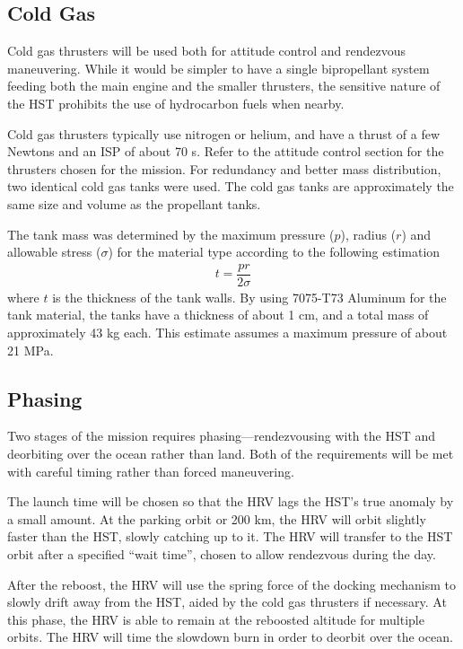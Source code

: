 \documentclass[paper=letter, fontsize=11pt]{scrartcl} %
\numberwithin{equation}{section} %
\numberwithin{figure}{section} %
\numberwithin{table}{section} %
\begin{document}
\subsection{Cold Gas}

Cold gas thrusters will be used both for attitude control and rendezvous maneuvering. While it would be simpler to have a single bipropellant system feeding both the main engine and the smaller thrusters, the sensitive nature of the HST prohibits the use of hydrocarbon fuels when nearby.

Cold gas thrusters typically use nitrogen or helium, and have a thrust of a few Newtons and an ISP of about 70 s. Refer to the attitude control section for the thrusters chosen for the mission. For redundancy and better mass distribution, two identical cold gas tanks were used. The cold gas tanks are approximately the same size and volume as the propellant tanks.

The tank mass was determined by the maximum pressure ($p$), radius ($r$) and allowable stress ($\sigma$) for the material type according to the following estimation
\begin{align*}
t = \dfrac{p r}{2 \sigma}
\end{align*}
where $t$ is the thickness of the tank walls. By using 7075-T73 Aluminum for the tank material, the tanks have a thickness of about 1 cm, and a total mass of approximately 43 kg each. This estimate assumes a maximum pressure of about 21 MPa.

\subsection{Phasing}

Two stages of the mission requires phasing---rendezvousing with the HST and deorbiting over the ocean rather than land. Both of the requirements will be met with careful timing rather than forced maneuvering.

The launch time will be chosen so that the HRV lags the HST's true anomaly by a small amount. At the parking orbit or 200 km, the HRV will orbit slightly faster than the HST, slowly catching up to it. The HRV will transfer to the HST orbit after a specified ``wait time'', chosen to allow rendezvous during the day.

After the reboost, the HRV will use the spring force of the docking mechanism to slowly drift away from the HST, aided by the cold gas thrusters if necessary. At this phase, the HRV is able to remain at the reboosted altitude for multiple orbits. The HRV will time the slowdown burn in order to deorbit over the ocean.
\end{document}
